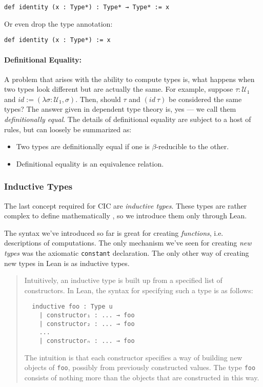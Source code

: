 \begin{lstlisting}
def identity (x : Type*) : Type* → Type* := x
\end{lstlisting}

\noindent Or even drop the type annotation:

\begin{lstlisting}
def identity (x : Type*) := x
\end{lstlisting}

\paragraph{Definitional Equality:}

A problem that arises with the ability to compute types is, what happens when two types look different but are actually the same.
For example, suppose $\tau : \mathcal{U}_1$ and $id := (\lambda \sigma : \mathcal{U}_1, \sigma)$.
Then, should $\tau$ and $(id\ \tau)$ be considered the same types?
The answer given in dependent type theory is, yes --- we call them \emph{definitionally equal}. 
The details of definitional equality are subject to a host of rules, but can loosely be summarized as:

\begin{itemize}
  \item Two types are definitionally equal if one is $\beta$-reducible to the other.
  \item Definitional equality is an equivalence relation.
\end{itemize}

\subsubsection{Inductive Types}
\label{section:inductive-types}

The last concept required for CIC are \emph{inductive types}. 
These types are rather complex to define mathematically \cite[p.~9]{mario}, so we introduce them only through Lean.

The syntax we've introduced so far is great for creating \emph{functions}, i.e. descriptions of computations.
The only mechanism we've seen for creating \emph{new types} was the axiomatic \verb|constant| declaration.
The only other way of creating new types in Lean is as inductive types.

\begin{quote}
Intuitively, an inductive type is built up from a specified list of constructors. In Lean, the syntax for specifying such a type is as follows:

\begin{lstlisting}
  inductive foo : Type u
    | constructor₁ : ... → foo
    | constructor₂ : ... → foo
    ...
    | constructorₙ : ... → foo
\end{lstlisting}

The intuition is that each constructor specifies a way of building new objects of \lstinline{foo}, possibly from previously constructed values. 
The type \lstinline{foo} consists of nothing more than the objects that are constructed in this way.\hfill\cite{leanbook}
\end{quote}

